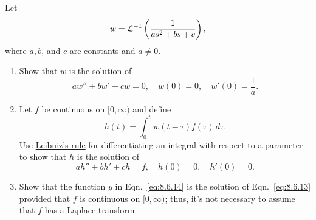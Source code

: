 \documentclass{ximera}
\begin{document}
\begin{problem}\label{exer:8.6.11}
Let
$$
w={\cal L}^{-1}\left(\frac{1}{as^2+bs+c}\right),
$$
where $a,b$, and $c$ are constants and $a\ne0$.
\begin{enumerate}
\item %
Show that $w$ is the solution of
$$
aw''+bw'+cw=0,\quad w(0)=0,\quad w'(0)=\frac{1}{a}.
$$
\item\label{exer:8.6.11b} %
Let $f$ be continuous on $[0,\infty)$  and define
$$
h(t)=\int_0^t w(t-\tau)f(\tau)\,d\tau.
$$
Use
\href{http://www-history.mcs.st-and.ac.uk/Mathematicians/Leibniz.html}{Leibniz's rule} for differentiating an integral with
respect to a parameter to show  that $h$ is the solution of
$$
ah''+bh'+ch=f,\quad h(0)=0,\quad h'(0)=0.
$$
\item %
 Show that the function $y$ in  Eqn.~\eqref{eq:8.6.14} is the solution of
Eqn.~\eqref{eq:8.6.13} provided that $f$ is continuous on $[0,\infty)$;
thus, it's not necessary to assume that $f$ has a Laplace transform.
\end{enumerate}
\end{problem}
\end{document}
